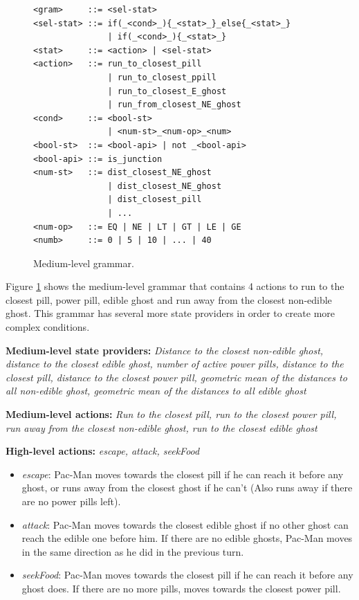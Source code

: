 \documentclass{llncs}
\newcommand{\paco}{Pac-Man }
\begin{document}
\begin{figure}[tb]
	\centering
\begin{lstlisting}[frame=single, breaklines=false, basicstyle=\fontsize{10}{11}\ttfamily]
<gram>     ::= <sel-stat>
<sel-stat> ::= if(_<cond>_){_<stat>_}_else{_<stat>_}
               | if(_<cond>_){_<stat>_}
<stat>     ::= <action> | <sel-stat>
<action>   ::= run_to_closest_pill 
               | run_to_closest_ppill 
               | run_to_closest_E_ghost 
               | run_from_closest_NE_ghost
<cond>     ::= <bool-st>  
               | <num-st>_<num-op>_<num> 
<bool-st>  ::= <bool-api> | not _<bool-api>
<bool-api> ::= is_junction
<num-st>   ::= dist_closest_NE_ghost
               | dist_closest_NE_ghost 
               | dist_closest_pill
               | ...
<num-op>   ::= EQ | NE | LT | GT | LE | GE
<numb>     ::= 0 | 5 | 10 | ... | 40
\end{lstlisting} %
	\caption{Medium-level grammar.}
	\label{fig:ml-grammar}
\end{figure}

Figure \ref{fig:ml-grammar} shows the medium-level grammar that contains 4 actions to run to the closest pill, power pill, edible ghost and run away from the closest non-edible ghost. This grammar has several more state providers in order to create more complex conditions.

\textbf{Medium-level state providers:}
\textit{Distance to the closest non-edible ghost, distance to the closest edible ghost, number of active power pills, distance to the closest pill, distance to the closest power pill, geometric mean of the distances to all non-edible ghost, geometric mean of the distances to all edible ghost}

\textbf{Medium-level actions:}
\textit{Run to the closest pill, run to the closest power pill, run away from the closest non-edible ghost, run to the closest edible ghost}

\textbf{High-level actions:}
\textit{escape, attack, seekFood}
\begin{itemize}
\addtolength{\itemindent}{1cm}
\item \textit{escape}: \paco moves towards the closest pill if he can reach it before any ghost, or runs away from the closest ghost if he can't (Also runs away if there are no power pills left).
\item \textit{attack}: \paco moves towards the closest edible ghost if no other ghost can reach the edible one before him. If there are no edible ghosts, \paco moves in the same direction as he did in the previous turn.
\item \textit{seekFood}: \paco moves towards the closest pill if he can reach it before any ghost does. If there are no more pills, moves towards the closest power pill.
\end{itemize}
\end{document}
